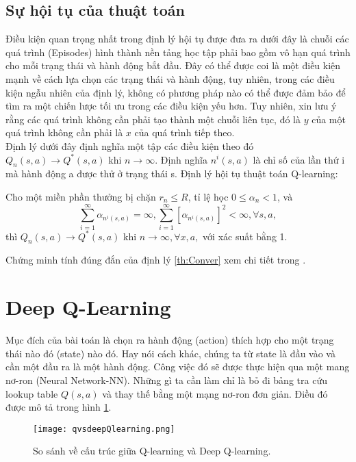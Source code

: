 \subsection{Sự hội tụ của thuật toán}
Điều kiện quan trọng nhất trong định lý hội tụ được đưa ra dưới đây là chuỗi các quá trình (Episodes) hình thành nền tảng học tập phải 
bao gồm vô hạn quá trình cho mỗi trạng thái và hành động bắt đầu. Đây có thể được coi là một điều kiện mạnh về cách lựa chọn các 
trạng thái và hành động, tuy nhiên, trong các điều kiện ngẫu nhiên của định lý, không có phương pháp nào có thể được đảm bảo 
để tìm ra một chiến lược tối ưu trong các điều kiện yếu hơn. Tuy nhiên, xin lưu ý rằng các quá trình không cần phải tạo thành một 
chuỗi liên tục, đó là $y$ của một quá trình không cần phải là $x$ của quá trình tiếp theo.\\
\indent Định lý dưới đây định nghĩa một tập các điều kiện theo đó $Q_n(s,a) \to Q^{*}(s,a)$ khi $n \to \infty$. 
Định nghĩa $n^{i}(s, a)$ là chỉ số của lần thứ i mà hành động a được thử ở trạng thái s.
Định lý hội tụ thuật toán Q-learning:
\begin{theorem}
    \label{th:Conver}
    Cho một miền phần thưởng bị chặn $r_n \leq R$, tỉ lệ học $0 \leq \alpha_n < 1$, và
    \begin{equation}
        \sum_{i=1}^{\infty}\alpha_{n^{i}(s,a)} = \infty, \sum_{i=1}^{\infty}[\alpha_{n^{i}(s,a)}]^2 < \infty, \forall s, a,
    \end{equation} 
    thì $Q_n(s,a) \to Q^{*}(s,a)$ khi $n \to \infty, \forall x, a,$ với xác suất bằng 1.
\end{theorem}
Chứng minh tính đúng đắn của định lý \ref{th:Conver} xem chi tiết trong \cite{Watkins1992}.
\section{Deep Q-Learning}
Mục đích của bài toán là chọn ra hành động (action) thích hợp cho một trạng thái nào đó (state) 
nào đó. Hay nói cách khác, chúng ta từ state là đầu vào và cần một đầu ra là một hành động. 
Công việc đó sẽ được thực hiện qua một mang nơ-ron (Neural Network-NN). Những gì ta cần làm 
chỉ là bỏ đi  bảng tra cứu lookup table $Q(s,a)$ và thay thế bằng một mạng nơ-ron đơn giản. 
Điều đó được mô tả trong hình \ref{fig:qlearning}.
\begin{figure}[ht]
    \centering
    \texttt{[image: qvsdeepQlearning.png]}
    \caption{So sánh về cấu trúc giữa Q-learning và Deep Q-learning.}
    \label{fig:qlearning}
\end{figure}
